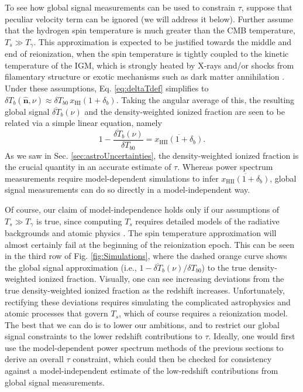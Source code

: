 \documentclass[twocolumn,aps,prd,nofootinbib,showpacs]{revtex4-1}
\begin{document}
To see how global signal measurements can be used to constrain $\tau$, suppose that peculiar velocity term can be ignored (we will address it below). Further assume that the hydrogen spin temperature is much greater than the CMB temperature, $T_s \gg T_\gamma$. This approximation is expected to be justified towards the middle and end of reionization, when the spin temperature is tightly coupled to the kinetic temperature of the IGM, which is strongly heated by X-rays and/or shocks from filamentary structure or exotic mechanisms such as dark matter annihilation \cite{gnedin_and_shaver2004,pritchard_and_loeb2010,mirabel_et_al2011,valdes_et_al2013,evoli_et_al2014}. Under these assumptions, Eq. \eqref{eq:deltaTdef} simplifies to $\delta T_b(\mathbf{\hat{n}}, \nu) \approx \delta T_{b0}\, x_\textrm{HI}  (1 + \delta_b)$. Taking the angular average of this, the resulting global signal $\overline{\delta T}_b (\nu)$ and the density-weighted ionized fraction are seen to be related via a simple linear equation, namely
\begin{equation}
\label{eq:globalSigDirect}
1- \frac{\overline{\delta T}_b (\nu)}{\delta T_{b0}} = \overline{x_\textrm{HII} (1+\delta_b)}.
\end{equation}
As we saw in Sec. \ref{sec:astroUncertainties}, the density-weighted ionized fraction is the crucial quantity in an accurate estimate of $\tau$. Whereas power spectrum measurements require model-dependent simulations to infer $\overline{x_\textrm{HII} (1+\delta_b)}$, global signal measurements can do so directly in a model-independent way.

Of course, our claim of model-independence holds only if our assumptions of $T_s \gg T_\gamma$ is true, since computing $T_s$ requires detailed models of the radiative backgrounds and atomic physics \cite{hirata2006,hirata_and_sigurdson2007}. The spin temperature approximation will almost certainly fail at the beginning of the reionization epoch. This can be seen in the third row of Fig. \ref{fig:Simulations}, where the dashed orange curve shows the global signal approximation (i.e., $1- \overline{\delta T}_b (\nu)/\delta T_{b0}$) to the true density-weighted ionized fraction. Visually, one can see increasing deviations from the true density-weighted ionized fraction as the redshift increases. Unfortunately, rectifying these deviations requires simulating the complicated astrophysics and atomic processes that govern $T_s$, which of course requires a reionization model. The best that we can do is to lower our ambitions, and to restrict our global signal constraints to the lower redshift contributions to $\tau$. Ideally, one would first use the model-dependent power spectrum methods of the previous sections to derive an overall $\tau$ constraint, which could then be checked for consistency against a model-independent estimate of the low-redshift contributions from global signal measurements.
\end{document}
